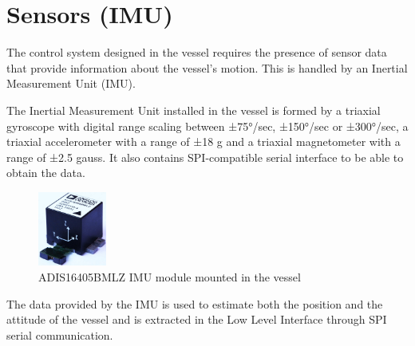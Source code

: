 \section{Sensors (IMU)}\label{sec:sensors}

The control system designed in the vessel requires the presence of sensor data that provide information about the vessel's motion. This is handled by an Inertial Measurement Unit (IMU).

The Inertial Measurement Unit installed in the vessel is formed by a triaxial gyroscope with digital range scaling between ±75°/sec, ±150°/sec or ±300°/sec, a triaxial accelerometer with a range of ±18 g and a triaxial magnetometer with a range of ±\num{2.5} gauss. It also contains SPI-compatible serial interface to be able to obtain the data. \cite{IMUDatasheet}
%
\begin{figure}[H]
	\includegraphics[width=0.2\textwidth]{figures/IMU}
	\caption{ADIS16405BMLZ IMU module mounted in the vessel \cite{IMUFigure}}
	\label{fig:IMU}
\end{figure}
%
The data provided by the IMU is used to estimate both the position and the attitude of the vessel and is extracted in the Low Level Interface through SPI serial communication.


%
